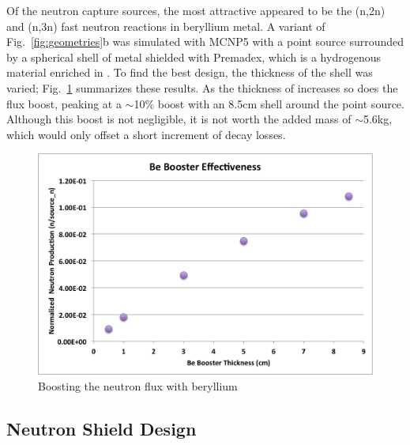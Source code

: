 \documentclass{mc2015}
\begin{document}
Of the neutron capture sources, the most attractive appeared to be the (n,2n) and (n,3n) fast neutron reactions in beryllium metal. A variant of Fig.\ \ref{fig:geometries}b was simulated with MCNP5 with a  point source surrounded by a spherical shell of  metal shielded with Premadex, which is a hydrogenous material enriched in .
To find the best design, the thickness of the  shell was varied; Fig.\ \ref{fig:beboosters} summarizes these results. As the thickness of  increases so does the flux boost, peaking at a $\sim$10\% boost with an 8.5cm shell around the point source. Although this boost is not negligible, it is not worth the added mass of $\sim$5.6kg, which would only offset a short increment of  decay losses. 

\begin{figure}
  \centering
  \includegraphics[width=4.5in]{Be_boost.png}
  \caption{Boosting the neutron flux with beryllium}
  \label{fig:beboosters}
\end{figure}

\subsection{Neutron Shield Design}
\label{sec:shields}
\end{document}
